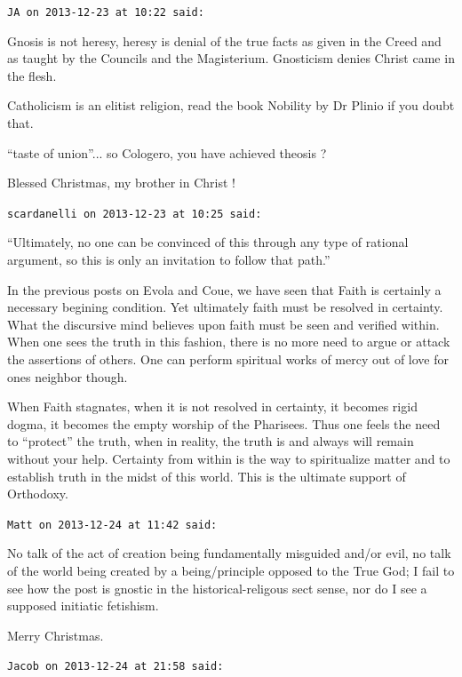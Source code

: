 \begin{footnotesize}\begin{sffamily}
\hfill

\texttt{JA on 2013-12-23 at 10:22 said: }

Gnosis is not heresy, heresy is denial of the true facts as given in the Creed and as taught by the Councils and the
Magisterium. Gnosticism denies Christ came in the flesh.

Catholicism is an elitist religion, read the book Nobility by Dr Plinio if you doubt that.

“taste of union”... so Cologero, you have achieved theosis ?

Blessed Christmas, my brother in Christ !

\hfill

\texttt{scardanelli on 2013-12-23 at 10:25 said: }

“Ultimately, no one can be convinced of this through any type of rational argument, so this is only an invitation to
follow that path.”

In the previous posts on Evola and Coue, we have seen that Faith is certainly a necessary begining condition. Yet
ultimately faith must be resolved in certainty. What the discursive mind believes upon faith must be seen and verified
within. When one sees the truth in this fashion, there is no more need to argue or attack the assertions of others. One
can perform spiritual works of mercy out of love for ones neighbor though. 

When Faith stagnates, when it is not resolved in certainty, it becomes rigid dogma, it becomes the empty worship of the
Pharisees. Thus one feels the need to “protect” the truth, when in reality, the truth is and always will remain without
your help. Certainty from within is the way to spiritualize matter and to establish truth in the midst of this world.
This is the ultimate support of Orthodoxy.

\hfill

\texttt{Matt on 2013-12-24 at 11:42 said: }

No talk of the act of creation being fundamentally misguided and/or evil, no talk of the world being created by a
being/principle opposed to the True God; I fail to see how the post is gnostic in the historical-religous sect sense,
nor do I see a supposed initiatic fetishism.

Merry Christmas.

\hfill

\texttt{Jacob on 2013-12-24 at 21:58 said: }


\end{sffamily}
\end{footnotesize}
